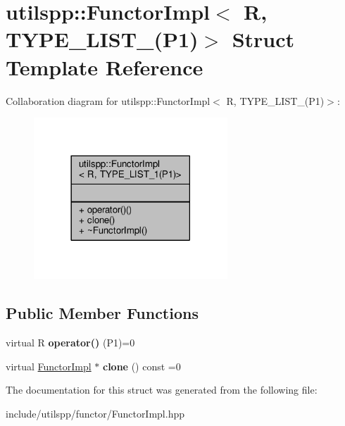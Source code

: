 \hypertarget{structutilspp_1_1FunctorImpl_3_01R_00_01TYPE__LIST__1_07P1_08_4}{\section{utilspp\-:\-:Functor\-Impl$<$ R, T\-Y\-P\-E\-\_\-\-L\-I\-S\-T\-\_(P1)$>$ Struct Template Reference}
\label{structutilspp_1_1FunctorImpl_3_01R_00_01TYPE__LIST__1_07P1_08_4}
}


Collaboration diagram for utilspp\-:\-:Functor\-Impl$<$ R, T\-Y\-P\-E\-\_\-\-L\-I\-S\-T\-\_(P1)$>$\-:
\nopagebreak
\begin{figure}[H]
\begin{center}
\leavevmode
\includegraphics[width=206pt]{structutilspp_1_1FunctorImpl_3_01R_00_01TYPE__LIST__1_07P1_08_4__coll__graph}
\end{center}
\end{figure}
\subsection*{Public Member Functions}
\begin{DoxyCompactItemize}
\item 
\hypertarget{structutilspp_1_1FunctorImpl_3_01R_00_01TYPE__LIST__1_07P1_08_4_abf621bfda0afeb269275de7972a5c779}{virtual R {\bfseries operator()} (P1)=0}\label{structutilspp_1_1FunctorImpl_3_01R_00_01TYPE__LIST__1_07P1_08_4_abf621bfda0afeb269275de7972a5c779}

\item 
\hypertarget{structutilspp_1_1FunctorImpl_3_01R_00_01TYPE__LIST__1_07P1_08_4_aae926b6655a4b24e0321a64a8343e5e6}{virtual \hyperlink{structutilspp_1_1FunctorImpl}{Functor\-Impl} $\ast$ {\bfseries clone} () const =0}\label{structutilspp_1_1FunctorImpl_3_01R_00_01TYPE__LIST__1_07P1_08_4_aae926b6655a4b24e0321a64a8343e5e6}

\end{DoxyCompactItemize}


The documentation for this struct was generated from the following file\-:\begin{DoxyCompactItemize}
\item 
include/utilspp/functor/Functor\-Impl.\-hpp\end{DoxyCompactItemize}
